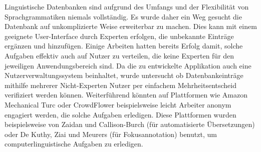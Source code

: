 Linguistische Datenbanken sind aufgrund des Umfangs und der Flexibilität von Sprachgrammatiken niemals vollständig. Es wurde daher ein Weg gesucht die Datenbank auf unkomplizierte Weise erweiterbar zu machen. Dies kann mit einem geeignete User-Interface durch Experten erfolgen, die unbekannte Einträge ergänzen und hinzufügen. Einige Arbeiten hatten bereits Erfolg damit, solche Aufgaben effektiv auch auf Nutzer zu verteilen, die keine Experten für den jeweiligen Anwendungsbereich sind. Da die zu entwickelte Applikation auch eine Nutzerverwaltungssystem beinhaltet, wurde untersucht ob Datenbankeinträge mithilfe mehrerer Nicht-Experten Nutzer per einfachem Mehrheitsentscheid verifiziert werden können. Weiterführend könnten auf Plattformen wie Amazon Mechanical Turc oder CrowdFlower beispielsweise leicht Arbeiter anonym engagiert werden, die solche Aufgaben erledigen\cite{Snow2008}. Diese Plattformen wurden beispielsweise von Zaidan und Callison-Burch (für automatisierte Übersetzungen)\cite{Zaidan2011} oder De Kuthy, Ziai und Meurers\cite{Meurers2015} (für Fokusannotation) benutzt, um computerlinguistische Aufgaben zu erledigen.